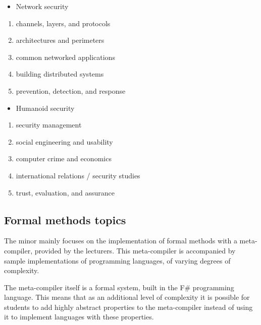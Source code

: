 	\begin{itemize}
	\itemsep1pt\parskip0pt
	\item
	  Network security
	\end{itemize}

	\begin{enumerate}
	\def\labelenumi{\arabic{enumi}.}
	\itemsep1pt\parskip0pt
	\item
	  channels, layers, and protocols
	\item
	  architectures and perimeters
	\item
	  common networked applications
	\item
	  building distributed systems
	\item
	  prevention, detection, and response
	\end{enumerate}

	\begin{itemize}
	\itemsep1pt\parskip0pt
	\item
	  Humanoid security
	\end{itemize}

	\begin{enumerate}
	\def\labelenumi{\arabic{enumi}.}
	\itemsep1pt\parskip0pt
	\item
	  security management
	\item
	  social engineering and usability
	\item
	  computer crime and economics
	\item
	  international relations / security studies
	\item
	  trust, evaluation, and assurance
	\end{enumerate}

	\subsection*{Formal methods topics}
		The minor mainly focuses on the implementation of formal methods with a meta-compiler, provided by the lecturers. This meta-compiler is accompanied by sample implementations of programming languages, of varying degrees of complexity.
		
		The meta-compiler itself is a formal system, built in the F\# programming language. This means that as an additional level of complexity it is possible for students to add highly abstract properties to the meta-compiler instead of using it to implement languages with these properties.
